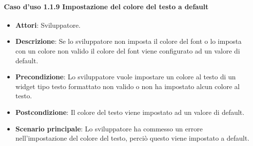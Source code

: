 \paragraph{Caso d'uso 1.1.9 Impostazione del colore del testo a default}
\begin{itemize}
\item\textbf{Attori}: Sviluppatore.
\item\textbf{Descrizione}: Se lo sviluppatore non imposta il colore del font o lo imposta con un colore non valido il colore del font viene configurato ad un valore di default.
\item\textbf{Precondizione}: Lo sviluppatore vuole impostare un colore al testo di un widget tipo testo formattato non valido o non ha impostato alcun colore al testo.
\item\textbf{Postcondizione}: Il colore del testo viene impostato ad un valore di default.
\item\textbf{Scenario principale}: Lo sviluppatore ha commesso un errore nell'impostazione del colore del testo, perciò questo viene impostato a default.
\end{itemize}